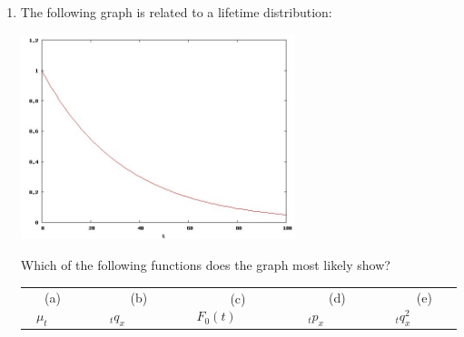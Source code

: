 \documentclass[11pt,fleqn,oneside]{book}
\begin{document}
\begin{enumerate}
\normalsize
\item The following graph is related to a lifetime distribution:
\begin{center}
\includegraphics[width=8cm]{Graphs/Graph_QUIZ1_2008.jpg}
\end{center}
Which of the following functions does the graph most likely show?

\vspace{0.35cm}
\small
\begin{center}
\begin{tabular}{c c c c c}
(a) $\mu_t\;\;\;\;\;\;$ & 
$\;\;\;\;\;\;$(b) ${_tq_x}\;\;\;\;\;\;$ &
$\;\;\;\;\;\;$(c) ${F_0(t)}\;\;\;\;\;\;$ & 
$\;\;\;\;\;\;$(d) ${_tp_x} \;\;\;\;\;\;$ &
$\;\;\;\;\;\;$(e) ${_tq^2_x}\;\;\;\;\;\;$ 
\end{tabular}
\end{center}
\end{enumerate}

\normalsize


\newpage
\end{document}
